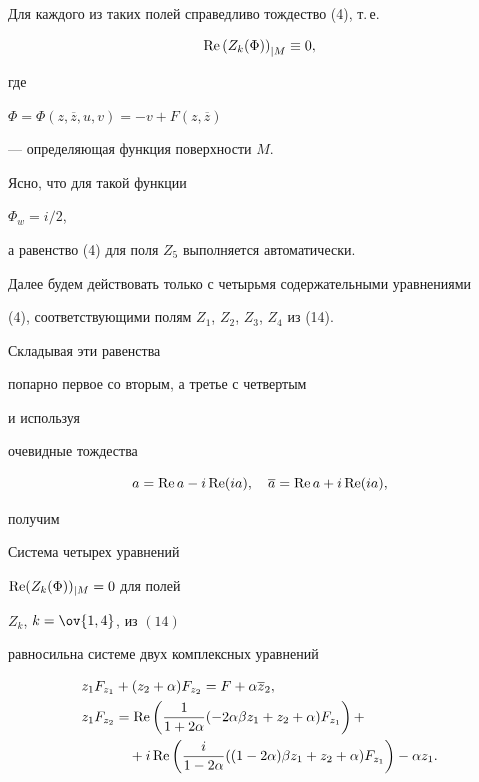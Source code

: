 Для каждого из таких полей справедливо тождество (4), т.\,е.


$$


 \re \left( Z_k(\Phi) \right)_{|M} \equiv 0,


$$


где 


$\Phi = \Phi( z,\overline z, u,v ) = - v + F(z,\overline z) $


--- определяющая функция поверхности $ M $.





Ясно, что для такой функции 


$  \Phi_w = i/2$, 


а равенство (4) для поля $ Z_5 $ выполняется автоматически.


 Далее будем действовать только с четырьмя содержательными уравнениями 


(4), соответствующими полям $ Z_1$, $Z_2$, $Z_3$, $Z_4 $ из (14). 





Складывая эти равенства 


попарно первое со вторым, а третье с четвертым


и используя 


очевидные тождества


$$


 a = \re  a - i \re ( i a ), \ \ \


 \overline a = \re  a + i \re ( i a ),


$$


получим 





\begin{prop}


Система четырех уравнений 


$ \operatorname{Re} ( Z_k(\Phi))_{|M} = 0 $ для полей 


$Z_k$, $k=\ov{1,4}$, из $(14)$ 


равносильна системе двух комплексных уравнений


\begin{align}


z_1 { F }_{z_1} &+ ( z_2 + \alpha )  F_{z_2} =


F + \alpha \overline z_2, \\ 


z_1 F_{ z_2} &=


\re \left( \frac 1{ 1 + 2\alpha} (- 2 \alpha \beta z_1 + z_2 + \alpha ) 


 F_{z_1} \right ) +\notag\\


&\quad + i


\re \left( \frac i{ 1 - 2\alpha} (( 1 - 2 \alpha) \beta z_1 + z_2 + \alpha )


 F_{z_1} \right ) - \alpha z_1.


\end{align}


\end{prop}





